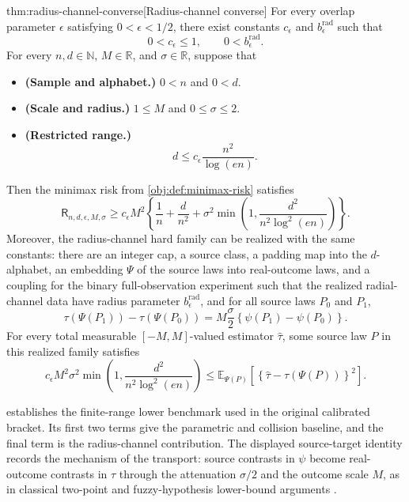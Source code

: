 \begin{theoremv}{thm:radius-channel-converse}[Radius-channel converse]
For every overlap parameter \(\epsilon\) satisfying \(0<\epsilon<1/2\), there exist constants \(c_{\epsilon}\) and \(b_{\epsilon}^{\mathrm{rad}}\) such that
\[
0<c_{\epsilon}\le 1,
\qquad
0<b_{\epsilon}^{\mathrm{rad}}.
\]
For every \(n,d\in\mathbb N\), \(M\in\mathbb R\), and \(\sigma\in\mathbb R\), suppose that
\begin{itemize}
\item \textbf{(Sample and alphabet.)} \(0<n\) and \(0<d\).
\item \textbf{(Scale and radius.)} \(1\le M\) and \(0\le\sigma\le2\).
\item \textbf{(Restricted range.)}
\[
d\le c_{\epsilon}\frac{n^2}{\log(en)}.
\]
\end{itemize}
Then the minimax risk from \cref{obj:def:minimax-risk} satisfies
\[
\mathsf R_{n,d,\epsilon,M,\sigma}
\ge
c_{\epsilon}M^2
\left\{
\frac1n+\frac d{n^2}
+\sigma^2
\min\left(1,\frac{d^2}{n^2\log^2(en)}\right)
\right\}.
\]
Moreover, the radius-channel hard family can be realized with the same constants: there are an integer cap, a source class, a padding map into the \(d\)-alphabet, an embedding \(\Psi\) of the source laws into real-outcome laws, and a coupling for the binary full-observation experiment such that the realized radial-channel data have radius parameter \(b_{\epsilon}^{\mathrm{rad}}\), and for all source laws \(P_0\) and \(P_1\),
\[
\tau(\Psi(P_1))-\tau(\Psi(P_0))
=
M\frac{\sigma}{2}
\left\{\psi(P_1)-\psi(P_0)\right\}.
\]
For every total measurable \([-M,M]\)-valued estimator \(\widehat\tau\), some source law \(P\) in this realized family satisfies
\[
c_{\epsilon}M^2\sigma^2
\min\left(1,\frac{d^2}{n^2\log^2(en)}\right)
\le
\mathbb E_{\Psi(P)}
\left[
\left\{\widehat\tau-\tau(\Psi(P))\right\}^2
\right].
\]
\end{theoremv}

 establishes the finite-range lower benchmark used in the original calibrated bracket. Its first two terms give the parametric and collision baseline, and the final term is the radius-channel contribution. The displayed source-target identity records the mechanism of the transport: source contrasts in \(\psi\) become real-outcome contrasts in \(\tau\) through the attenuation \(\sigma/2\) and the outcome scale \(M\), as in classical two-point and fuzzy-hypothesis lower-bound arguments \citep{LeCam1986,Tsybakov2009,Cai2011,Donoho1990}.

